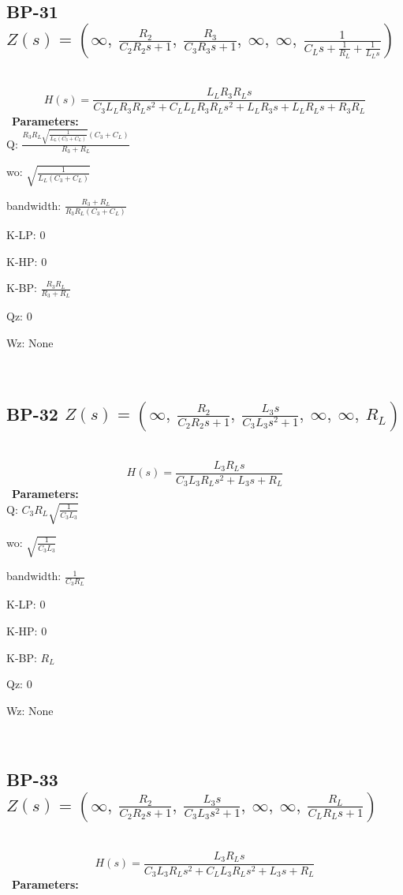 \documentclass{article}
\begin{document}
\ 

\subsection{BP-31 $Z(s) = \left( \infty, \  \frac{R_{2}}{C_{2} R_{2} s + 1}, \  \frac{R_{3}}{C_{3} R_{3} s + 1}, \  \infty, \  \infty, \  \frac{1}{C_{L} s + \frac{1}{R_{L}} + \frac{1}{L_{L} s}}\right)$ } \ 
\textbf{\[H(s) = \frac{L_{L} R_{3} R_{L} s}{C_{3} L_{L} R_{3} R_{L} s^{2} + C_{L} L_{L} R_{3} R_{L} s^{2} + L_{L} R_{3} s + L_{L} R_{L} s + R_{3} R_{L}}\] } \ 
\textbf{Parameters:}\\ 

Q: $\frac{R_{3} R_{L} \sqrt{\frac{1}{L_{L} \left(C_{3} + C_{L}\right)}} \left(C_{3} + C_{L}\right)}{R_{3} + R_{L}}$\ 

wo: $\sqrt{\frac{1}{L_{L} \left(C_{3} + C_{L}\right)}}$\ 

bandwidth: $\frac{R_{3} + R_{L}}{R_{3} R_{L} \left(C_{3} + C_{L}\right)}$\ 

K-LP: $0$\ 

K-HP: $0$\ 

K-BP: $\frac{R_{3} R_{L}}{R_{3} + R_{L}}$\ 

Qz: $0$\ 

Wz: $\text{None}$\ 

\ 

\subsection{BP-32 $Z(s) = \left( \infty, \  \frac{R_{2}}{C_{2} R_{2} s + 1}, \  \frac{L_{3} s}{C_{3} L_{3} s^{2} + 1}, \  \infty, \  \infty, \  R_{L}\right)$ } \ 
\textbf{\[H(s) = \frac{L_{3} R_{L} s}{C_{3} L_{3} R_{L} s^{2} + L_{3} s + R_{L}}\] } \ 
\textbf{Parameters:}\\ 

Q: $C_{3} R_{L} \sqrt{\frac{1}{C_{3} L_{3}}}$\ 

wo: $\sqrt{\frac{1}{C_{3} L_{3}}}$\ 

bandwidth: $\frac{1}{C_{3} R_{L}}$\ 

K-LP: $0$\ 

K-HP: $0$\ 

K-BP: $R_{L}$\ 

Qz: $0$\ 

Wz: $\text{None}$\ 

\ 

\subsection{BP-33 $Z(s) = \left( \infty, \  \frac{R_{2}}{C_{2} R_{2} s + 1}, \  \frac{L_{3} s}{C_{3} L_{3} s^{2} + 1}, \  \infty, \  \infty, \  \frac{R_{L}}{C_{L} R_{L} s + 1}\right)$ } \ 
\textbf{\[H(s) = \frac{L_{3} R_{L} s}{C_{3} L_{3} R_{L} s^{2} + C_{L} L_{3} R_{L} s^{2} + L_{3} s + R_{L}}\] } \ 
\textbf{Parameters:}\\ 
\end{document}

